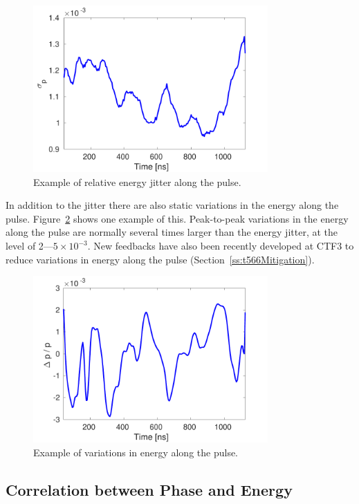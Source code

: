 \begin{figure}
  \centering
  \includegraphics[width=0.8\textwidth]{Figures/propagation/enJitter_along}
  \caption{Example of relative energy jitter along the pulse.}
  \label{f:enJitter_along}
\end{figure}

In addition to the jitter there are also static variations in the energy along the pulse. Figure~\ref{f:enMeanAlong} shows one example of this. Peak-to-peak variations in the energy along the pulse are normally several times larger than the energy jitter, at the level of 2---\(5\times 10^{-3}\). New feedbacks have also been recently developed at CTF3 to reduce variations in energy along the pulse (Section~\ref{ss:t566Mitigation}).

\begin{figure}
  \centering
  \includegraphics[width=0.8\textwidth]{Figures/propagation/enMeanAlong}
  \caption{Example of variations in energy along the pulse.}
  \label{f:enMeanAlong}
\end{figure}


\subsection{Correlation between Phase and Energy}
\label{ss:corrPhaseEnergy}

